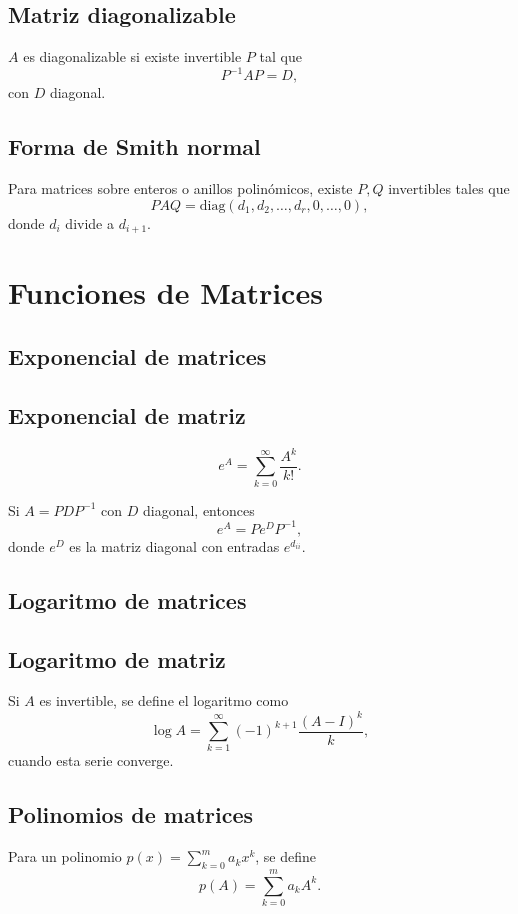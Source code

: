\documentclass{article}
\begin{document}
\subsection{Matriz diagonalizable}
\( A \) es diagonalizable si existe invertible \( P \) tal que
\[
P^{-1} A P = D,
\]
con \( D \) diagonal.


\subsection{Forma de Smith normal}
Para matrices sobre enteros o anillos polinómicos, existe \( P,Q \) invertibles tales que
\[
P A Q = \text{diag}(d_1, d_2, \ldots, d_r, 0, \ldots, 0),
\]
donde \( d_i \) divide a \( d_{i+1} \).


\section{Funciones de Matrices}

\subsection{Exponencial de matrices}

\subsection{Exponencial de matriz}
\[
e^{A} = \sum_{k=0}^\infty \frac{A^k}{k!}.
\]


Si \( A = P D P^{-1} \) con \( D \) diagonal, entonces
\[
e^A = P e^D P^{-1},
\]
donde \( e^D \) es la matriz diagonal con entradas \( e^{d_{ii}} \).


\subsection{Logaritmo de matrices}

\subsection{Logaritmo de matriz}
Si \( A \) es invertible, se define el logaritmo como
\[
\log A = \sum_{k=1}^\infty (-1)^{k+1} \frac{(A - I)^k}{k},
\]
cuando esta serie converge.


\subsection{Polinomios de matrices}

Para un polinomio \( p(x) = \sum_{k=0}^m a_k x^k \), se define
\[
p(A) = \sum_{k=0}^m a_k A^k.
\]
\end{document}
